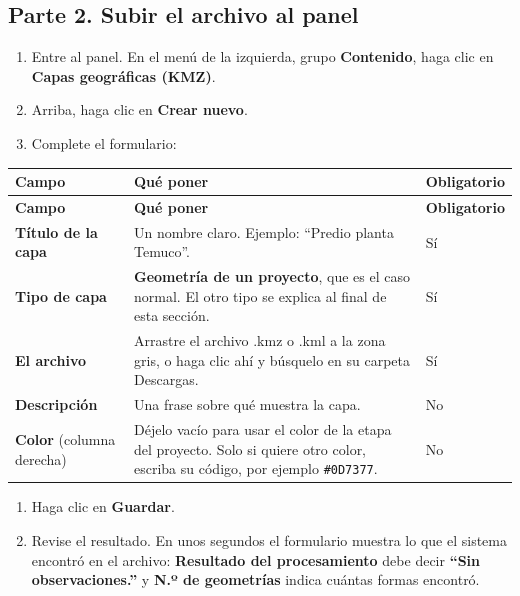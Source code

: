 \documentclass[11pt,letterpaper]{report}
\begin{document}
\subsection{Parte 2. Subir el archivo al panel}
\begin{enumerate}
  \item Entre al panel. En el menú de la izquierda, grupo \textbf{Contenido}, haga clic en \textbf{Capas geográficas (KMZ)}.
  \item Arriba, haga clic en \textbf{Crear nuevo}.
  \item Complete el formulario:
\end{enumerate}
\begin{longtable}{>{\raggedright\arraybackslash}p{}>{\raggedright\arraybackslash}p{}>{\raggedright\arraybackslash}p{}}
\rowcolor{h2vazul}\textbf{\color{white}Campo} & \textbf{\color{white}Qué poner} & \textbf{\color{white}Obligatorio} \\
\endfirsthead
\rowcolor{h2vazul}\textbf{\color{white}Campo} & \textbf{\color{white}Qué poner} & \textbf{\color{white}Obligatorio} \\
\endhead
\textbf{Título de la capa} & Un nombre claro. Ejemplo: “Predio planta Temuco”. & Sí \\ \midrule
\rowcolor{filaalt}\textbf{Tipo de capa} & \textbf{Geometría de un proyecto}, que es el caso normal. El otro tipo se explica al final de esta sección. & Sí \\ \midrule
\textbf{El archivo} & Arrastre el archivo .kmz o .kml a la zona gris, o haga clic ahí y búsquelo en su carpeta Descargas. & Sí \\ \midrule
\rowcolor{filaalt}\textbf{Descripción} & Una frase sobre qué muestra la capa. & No \\ \midrule
\textbf{Color} (columna derecha) & Déjelo vacío para usar el color de la etapa del proyecto. Solo si quiere otro color, escriba su código, por ejemplo \texttt{\#0D7377}. & No \\ \bottomrule
\end{longtable}
\begin{enumerate}[start=4]
  \item Haga clic en \textbf{Guardar}.
  \item Revise el resultado. En unos segundos el formulario muestra lo que el sistema encontró en el archivo: \textbf{Resultado del procesamiento} debe decir \textbf{“Sin observaciones.”} y \textbf{N.º de geometrías} indica cuántas formas encontró.
\end{enumerate}
\end{document}
